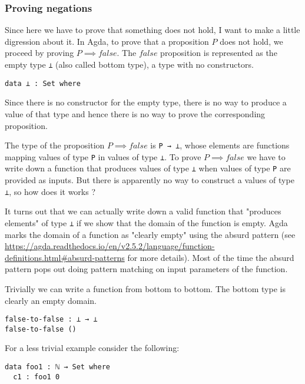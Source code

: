 \documentclass{article}
\begin{document}
\begin{tcolorbox}[breakable, enhanced, parbox=false]
\subsubsection*{Proving negations}

Since here we have to prove that something does not hold, I want to make a little digression about it.
In Agda, to prove that a proposition $P$ does not hold, we proceed by proving $P \implies false$.
The $false$ proposition is represented as the empty type \texttt{⊥} (also called bottom type), a type with no constructors.

\begin{verbatim}
data ⊥ : Set where
\end{verbatim}

Since there is no constructor for the empty type, there is no way to produce a value of that type and hence there is no way to prove the corresponding proposition.

The type of the proposition $P \implies false$ is \texttt{P → ⊥}, whose elements are functions mapping values of type \texttt{P} in values of type \texttt{⊥}.
To prove $P \implies false$ we have to write down a function that produces values of type \texttt{⊥} when values of type \texttt{P} are provided as inputs.
But there is apparently no way to construct a values of type \texttt{⊥}, so how does it works ?

It turns out that we can actually write down a valid function that "produces elements" of type \texttt{⊥} if we show that the domain of the function is empty.
Agda marks the domain of a function as "clearly empty" using the absurd pattern (see \url{https://agda.readthedocs.io/en/v2.5.2/language/function-definitions.html#absurd-patterns} for more details).
Most of the time the absurd pattern pops out doing pattern matching on input parameters of the function.

Trivially we can write a function from bottom to bottom.
The bottom type is clearly an empty domain.

\begin{verbatim}
false-to-false : ⊥ → ⊥
false-to-false ()
\end{verbatim}

For a less trivial example consider the following:
\begin{verbatim}
data foo1 : ℕ → Set where
  c1 : foo1 0


\end{verbatim}
\end{tcolorbox}
\end{document}
